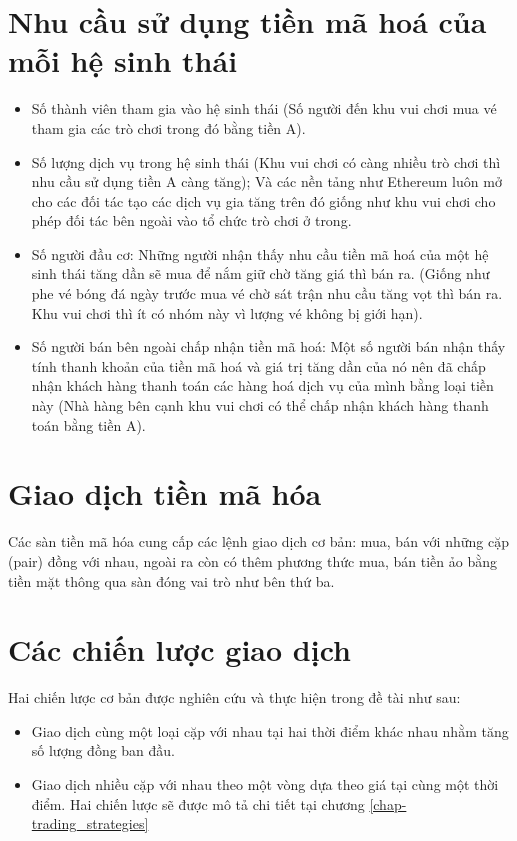 \section{Nhu cầu sử dụng tiền mã hoá của mỗi hệ sinh thái}
\begin{itemize}
    \item Số thành viên tham gia vào hệ sinh thái (Số người đến khu vui chơi mua vé tham gia các trò chơi trong đó bằng tiền A).
    \item Số lượng dịch vụ trong hệ sinh thái (Khu vui chơi có càng nhiều trò chơi thì nhu cầu sử dụng tiền A càng tăng); Và các nền tảng như Ethereum luôn mở cho các đối tác tạo các dịch vụ gia tăng trên đó giống như khu vui chơi cho phép đối tác bên ngoài vào tổ chức trò chơi ở trong.
    \item  Số người đầu cơ: Những người nhận thấy nhu cầu tiền mã hoá của một hệ sinh thái tăng dần sẽ mua để nắm giữ chờ tăng giá thì bán ra. (Giống như phe vé bóng đá ngày trước mua vé chờ sát trận nhu cầu tăng vọt thì bán ra. Khu vui chơi thì ít có nhóm này vì lượng vé không bị giới hạn).
    \item  Số người bán bên ngoài chấp nhận tiền mã hoá: Một số người bán nhận thấy tính thanh khoản của tiền mã hoá và giá trị tăng dần của nó nên đã chấp nhận khách hàng thanh toán các hàng hoá dịch vụ của mình bằng loại tiền này (Nhà hàng bên cạnh khu vui chơi có thể chấp nhận khách hàng thanh toán bằng tiền A).
\end{itemize}

\section{Giao dịch tiền mã hóa}
Các sàn tiền mã hóa cung cấp các lệnh giao dịch cơ bản: mua, bán với những cặp (pair) đồng với nhau, ngoài ra còn có thêm phương thức mua, bán tiền ảo bằng tiền mặt thông qua sàn đóng vai trò như bên thứ ba.

\section{Các chiến lược giao dịch}\label{trading_strategy}
Hai chiến lược cơ bản được nghiên cứu và thực hiện trong đề tài như sau:
\begin{itemize}
    \item Giao dịch cùng một loại cặp với nhau tại hai thời điểm khác nhau nhằm tăng số lượng đồng ban đầu.
    \item Giao dịch nhiều cặp với nhau theo một vòng dựa theo giá tại cùng một thời điểm.
Hai chiến lược sẽ được mô tả chi tiết tại chương \ref{chap-trading_strategies}
\end{itemize}
